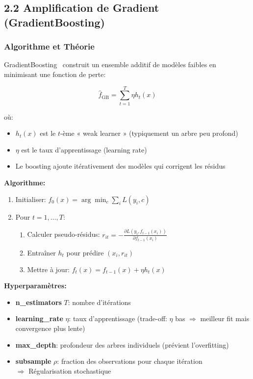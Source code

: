\documentclass[12pt,a4paper,french]{article}
\begin{document}
\subsection{2.2 Amplification de Gradient (GradientBoosting)}

\subsubsection{Algorithme et Théorie}

GradientBoosting~\cite{friedman2001} construit un ensemble additif de modèles faibles en minimisant une fonction de perte:

\begin{equation}
\hat{f}_{\text{GB}} = \sum_{t=1}^T \eta h_t(x)
\end{equation}

où:
\begin{itemize}
    \item $h_t(x)$ est le $t$-ème « weak learner » (typiquement un arbre peu profond)
    \item $\eta$ est le taux d'apprentissage (learning rate)
    \item Le boosting ajoute itérativement des modèles qui corrigent les résidus
\end{itemize}

\textbf{Algorithme:}
\begin{enumerate}
    \item Initialiser: $f_0(x) = \arg\min_c \sum_i L(y_i, c)$
    \item Pour $t = 1, \ldots, T$:
        \begin{enumerate}
            \item Calculer pseudo-résidus: $r_{it} = -\frac{\partial L(y_i, f_{t-1}(x_i))}{\partial f_{t-1}(x_i)}$
            \item Entraîner $h_t$ pour prédire $(x_i, r_{it})$
            \item Mettre à jour: $f_t(x) = f_{t-1}(x) + \eta h_t(x)$
        \end{enumerate}
\end{enumerate}

\textbf{Hyperparamètres:}
\begin{itemize}
    \item \textbf{n\_estimators} $T$: nombre d'itérations
    \item \textbf{learning\_rate} $\eta$: taux d'apprentissage (trade-off: $\eta$ bas $\Rightarrow$ meilleur fit mais convergence plus lente)
    \item \textbf{max\_depth}: profondeur des arbres individuels (prévient l'overfitting)
    \item \textbf{subsample} $\rho$: fraction des observations pour chaque itération
        \\ $\Rightarrow$ Régularisation stochastique
\end{itemize}
\end{document}
